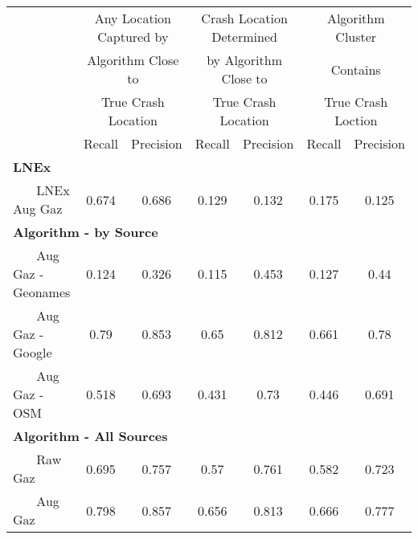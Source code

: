 \begin{tabular}{l cc | cc | cc } \hline  & \multicolumn{2}{c|}{Any Location Captured by} & \multicolumn{2}{c|}{Crash Location Determined} & \multicolumn{2}{c}{Algorithm Cluster} \\  & \multicolumn{2}{c|}{Algorithm Close to} & \multicolumn{2}{c|}{by Algorithm Close to}  & \multicolumn{2}{c}{Contains} \\  & \multicolumn{2}{c|}{True Crash Location} & \multicolumn{2}{c|}{True Crash Location}  & \multicolumn{2}{c}{True Crash Loction} \\  \hline  & Recall & Precision & Recall & Precision & Recall & Precision \\ \hline \multicolumn{3}{l|}{\bf LNEx} & & & & \\  ~~~ LNEx Aug Gaz & 0.674  &  0.686  &  0.129  &  0.132  &  0.175  &  0.125  \\ \multicolumn{3}{l|}{\bf Algorithm - by Source} & & & & \\  ~~~ Aug Gaz - Geonames & 0.124  &  0.326  &  0.115  &  0.453  &  0.127  &  0.44  \\  ~~~ Aug Gaz - Google & 0.79  &  0.853  &  0.65  &  0.812  &  0.661  &  0.78  \\  ~~~ Aug Gaz - OSM & 0.518  &  0.693  &  0.431  &  0.73  &  0.446  &  0.691  \\ \multicolumn{3}{l|}{\bf Algorithm - All Sources} & & & & \\  ~~~ Raw Gaz & 0.695  &  0.757  &  0.57  &  0.761  &  0.582  &  0.723  \\  ~~~ Aug Gaz & 0.798  &  0.857  &  0.656  &  0.813  &  0.666  &  0.777  \\ \hline \end{tabular} 